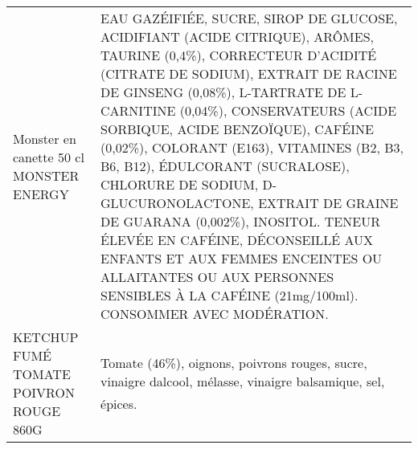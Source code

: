 \begin{longtable}{p{5cm}p{10cm}}
                                                                  Monster en canette 50 cl MONSTER ENERGY &                                                                                                                                                                                                                                                                                                                                                                                                              EAU GAZÉIFIÉE, SUCRE, SIROP DE GLUCOSE, ACIDIFIANT (ACIDE CITRIQUE), ARÔMES, TAURINE (0,4\%), CORRECTEUR D'ACIDITÉ (CITRATE DE SODIUM), EXTRAIT DE RACINE DE GINSENG (0,08\%), L-TARTRATE DE L-CARNITINE (0,04\%), CONSERVATEURS (ACIDE SORBIQUE, ACIDE BENZOÏQUE), CAFÉINE (0,02\%), COLORANT (E163), VITAMINES (B2, B3, B6, B12), ÉDULCORANT (SUCRALOSE), CHLORURE DE SODIUM, D-GLUCURONOLACTONE, EXTRAIT DE GRAINE DE GUARANA (0,002\%), INOSITOL.  TENEUR ÉLEVÉE EN CAFÉINE, DÉCONSEILLÉ AUX ENFANTS ET AUX FEMMES ENCEINTES OU ALLAITANTES OU AUX PERSONNES SENSIBLES À LA CAFÉINE (21mg/100ml). CONSOMMER AVEC MODÉRATION. \\
                                                                   KETCHUP FUMÉ TOMATE POIVRON ROUGE 860G &                                                                                                                                                                                                                                                                                                                                                                                                                                                                                                                                                                                                                                                                                                                                                                                                                                                                                                                             Tomate (46\%), oignons, poivrons rouges, sucre, vinaigre dalcool, mélasse, vinaigre balsamique, sel, épices. \\

\end{longtable}
